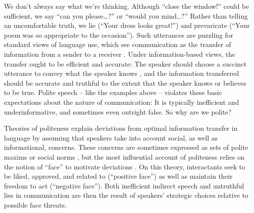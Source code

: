 \documentclass[12pt]{article}
\begin{document}


We don't always say what we're thinking. Although \enquote{close the
window!} could be sufficient, we say \enquote{can you please\ldots{}?}
or \enquote{would you mind\ldots{}?} Rather than telling an
uncomfortable truth, we lie (\enquote{Your dress looks great!}) and
prevaricate (\enquote{Your poem was so appropriate to the occasion}).
Such utterances are puzzling for standard views of language use, which
see communication as the transfer of information from a sender to a
receiver \cite{buhler1934, shannon1948, jakobson1960, frank2012}. Under
information-based views, the transfer ought to be efficient and
accurate: The speaker should choose a succinct utterance  to convey
what the speaker knows \cite{grice1975, searle1975},
and the information transferred should be accurate and truthful to the
extent that the speaker knows or believes to be true. Polite speech --
like the examples above -- violates these basic expectations about the
nature of communication: It is typically inefficient and
underinformative, and sometimes even outright false. So why are we
polite?

Theories of politeness explain deviations from optimal information
transfer in language by assuming that speakers take into account social,
as well as informational, concerns. These concerns are sometimes
expressed as sets of polite maxims \cite{leech1983} or social norms \cite{ide1989}, 
but the most influential account of politeness relies on the
notion of \enquote{face} to motivate deviations \cite{brown1987, goffman1967}. 
On this theory, interactants seek to be liked,
approved, and related to (\enquote{positive face}) as well as maintain
their freedom to act (\enquote{negative face}).
Both inefficient indirect speech and untruthful lies in communication
are then the result of speakers' strategic choices relative to possible
face threats.
\end{document}
